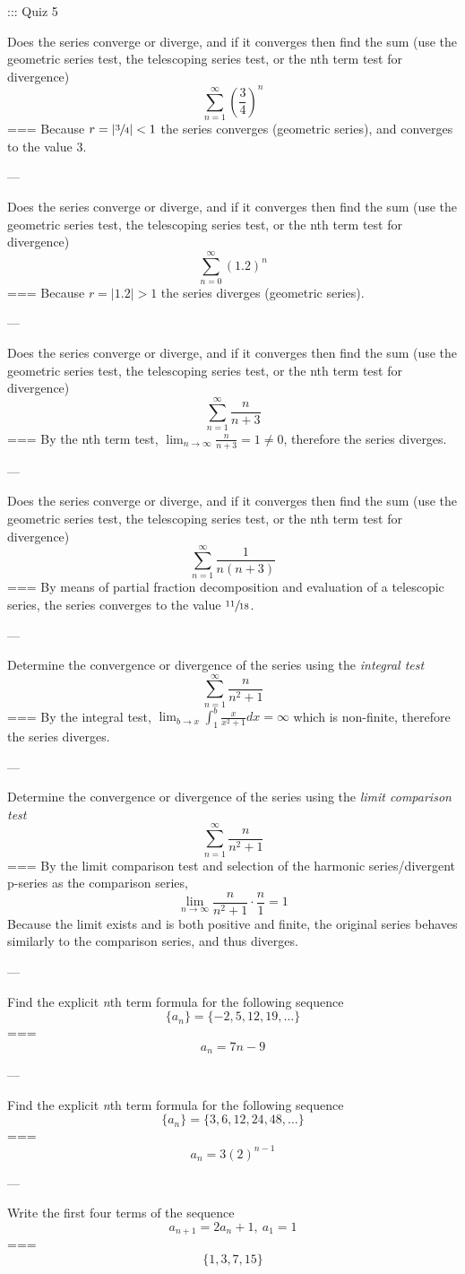::: Quiz 5

Does the series converge or diverge, and if it converges then find the sum (use
the geometric series test, the telescoping series test, or the nth term test for
divergence)
\[\sum_{n=1}^\infty\left(\frac{3}{4}\right)^n\]
===
Because \(r=|\sfrac{3}{4}|<1\) the series converges (geometric series), and
converges to the value 3.

---

Does the series converge or diverge, and if it converges then find the sum (use
the geometric series test, the telescoping series test, or the nth term test for
divergence)
\[\sum_{n=0}^\infty(1.2)^n\]
===
Because \(r=|1.2|>1\) the series diverges (geometric series).

---

Does the series converge or diverge, and if it converges then find the sum (use
the geometric series test, the telescoping series test, or the nth term test for
divergence)
\[\sum_{n=1}^\infty\frac{n}{n+3}\]
===
By the nth term test, \(\lim_{n\to\infty}\frac{n}{n+3}=1\neq 0\), therefore the
series diverges.

---

Does the series converge or diverge, and if it converges then find the sum (use
the geometric series test, the telescoping series test, or the nth term test for
divergence)
\[\sum_{n=1}^\infty\frac{1}{n(n+3)}\]
===
By means of partial fraction decomposition and evaluation of a telescopic
series, the series converges to the value \(\sfrac{11}{18}\).

---

Determine the convergence or divergence of the series using the \textit{integral
test}
\[\sum_{n=1}^\infty\frac{n}{n^2+1}\]
===
By the integral test, \(\lim_{b\to x}\int_1^b\frac{x}{x^2+1}dx=\infty\)
which is non-finite, therefore the series diverges.

---

Determine the convergence or divergence of the series using the \textit{limit comparison test}
\[\sum_{n=1}^\infty\frac{n}{n^2+1}\]
===
By the limit comparison test and selection of the harmonic series/divergent
p-series as the comparison series,
\[\displaystyle\lim_{n\to\infty}\frac{n}{n^2+1}\cdot\frac{n}{1}=1\]
Because the limit exists and is both positive and finite, the original series
behaves similarly to the comparison series, and thus diverges.

---


Find the explicit \textit{n}th term formula for the following sequence
\[\{a_n\}=\{-2,5,12,19,\dots\}\]
===
\[a_n=7n-9\]

---

Find the explicit \textit{n}th term formula for the following sequence
\[\{a_n\}=\{3,6,12,24,48,\dots\}\]
===
\[a_n=3(2)^{n-1}\]

---

Write the first four terms of the sequence
\[a_{n+1}=2a_n+1,\ a_1=1\]
===
\[\{1,3,7,15\}\]
